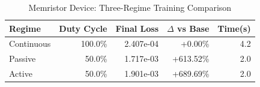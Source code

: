 \begin{table}[htbp]
\centering
\caption{Memristor Device: Three-Regime Training Comparison}
\label{tab:memristor_regimes}
\begin{tabular}{lrrrr}
\hline
Regime & Duty Cycle & Final Loss & $\Delta$ vs Base & Time(s) \\
\hline
Continuous & 100.0\% & 2.407e-04 & +0.00\% & 4.2 \\
Passive & 50.0\% & 1.717e-03 & +613.52\% & 2.0 \\
Active & 50.0\% & 1.901e-03 & +689.69\% & 2.0 \\
\hline
\end{tabular}
\end{table}

